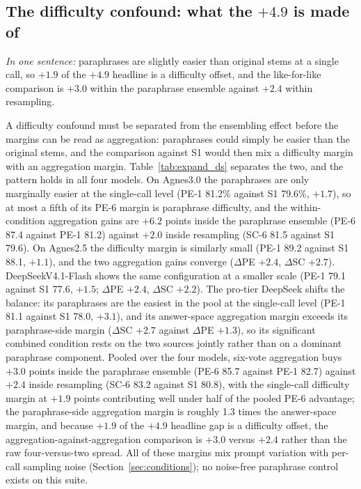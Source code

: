 \subsection{The difficulty confound: what the $+4.9$ is made of}
\label{sec:heldoutds}

\emph{In one sentence:} paraphrases are slightly easier than original stems at a single call, so $+1.9$ of the $+4.9$ headline is a difficulty offset, and the like-for-like comparison is $+3.0$ within the paraphrase ensemble against $+2.4$ within resampling.

A difficulty confound must be separated from the ensembling effect before the margins can be read as aggregation: paraphrases could simply be easier than the original stems, and the comparison against S1 would then mix a difficulty margin with an aggregation margin. Table~\ref{tab:expand_ds} separates the two, and the pattern holds in all four models. On Agnes3.0 the paraphrases are only marginally easier at the single-call level (PE-1 81.2\% against S1 79.6\%, $+1.7$), so at most a fifth of its PE-6 margin is paraphrase difficulty, and the within-condition aggregation gains are $+6.2$ points inside the paraphrase ensemble (PE-6 87.4 against PE-1 81.2) against $+2.0$ inside resampling (SC-6 81.5 against S1 79.6). On Agnes2.5 the difficulty margin is similarly small (PE-1 89.2 against S1 88.1, $+1.1$), and the two aggregation gains converge ($\Delta$PE $+2.4$, $\Delta$SC $+2.7$). DeepSeekV4.1-Flash shows the same configuration at a smaller scale (PE-1 79.1 against S1 77.6, $+1.5$; $\Delta$PE $+2.4$, $\Delta$SC $+2.2$). The pro-tier DeepSeek shifts the balance: its paraphrases are the easiest in the pool at the single-call level (PE-1 81.1 against S1 78.0, $+3.1$), and its answer-space aggregation margin exceeds its paraphrase-side margin ($\Delta$SC $+2.7$ against $\Delta$PE $+1.3$), so its significant combined condition rests on the two sources jointly rather than on a dominant paraphrase component. Pooled over the four models, six-vote aggregation buys $+3.0$ points inside the paraphrase ensemble (PE-6 85.7 against PE-1 82.7) against $+2.4$ inside resampling (SC-6 83.2 against S1 80.8), with the single-call difficulty margin at $+1.9$ points contributing well under half of the pooled PE-6 advantage; the paraphrase-side aggregation margin is roughly 1.3 times the answer-space margin, and because $+1.9$ of the $+4.9$ headline gap is a difficulty offset, the aggregation-against-aggregation comparison is $+3.0$ versus $+2.4$ rather than the raw four-versus-two spread. All of these margins mix prompt variation with per-call sampling noise (Section~\ref{sec:conditions}); no noise-free paraphrase control exists on this suite.

